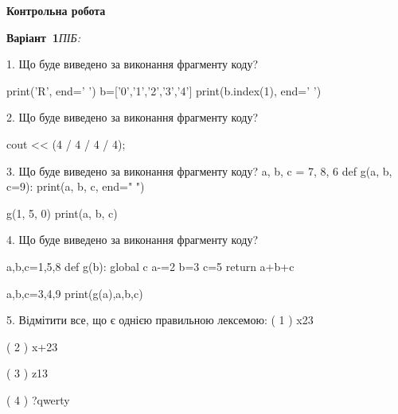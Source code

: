 \documentclass[11pt]{article}
\begin{document}
{\large\textbf{Контрольна робота}}

\textbf{Варіант \No\,1}\hfill \textit{ПІБ:}\,\underline{\hspace{60mm}}
\vspace{4mm}

1. Що буде виведено за виконання фрагменту коду?

print('R', end=' ')
b=['0','1','2','3','4']
print(b.index(1), end=' ')

\vspace{5mm}

2. Що буде виведено за виконання фрагменту коду?

cout << (4 / 4 / 4 / 4);
\vspace{5mm}

3. Що буде виведено за виконання фрагменту коду?
a, b, c = 7, 8, 6
def g(a, b, c=9):
    print(a, b, c, end=" ")

g(1, 5, 0)
print(a, b, c)
\vspace{5mm}

4. Що буде виведено за виконання фрагменту коду?

a,b,c=1,5,8
def g(b):
global c    a-=2
    b=3
    c=5
    return a+b+c

a,b,c=3,4,9
print(g(a),a,b,c)
\vspace{5mm}

5. %
Відмітити все, що є однією правильною лексемою:
( 1 ) x23

( 2 ) x+23

( 3 ) z13

( 4 ) ?qwerty
\vspace{5mm}

\newpage
\end{document}
